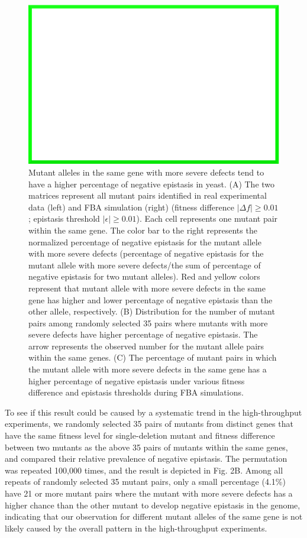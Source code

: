 \begin{figure}
\centering
\includegraphics[width=\textwidth]{dummy}
\caption{Mutant alleles in the same gene with more severe defects tend
to have a higher percentage of negative epistasis in yeast. (A) The
two matrices represent all mutant pairs identified in real
experimental data (left) and FBA simulation (right) (fitness
difference $\left|\Delta f\right| \geq 0.01$; epistasis threshold
$\left|\epsilon\right| \geq 0.01$). Each cell
represents one mutant pair within the same gene. The color bar to the
right represents the normalized percentage of negative epistasis for
the mutant allele with more severe defects (percentage of negative
epistasis for the mutant allele with more severe defects/the sum of
percentage of negative epistasis for two mutant alleles). Red and
yellow colors represent that mutant allele with more severe defects in
the same gene has higher and lower percentage of negative epistasis
than the other allele, respectively. (B) Distribution for the number
of mutant pairs among randomly selected 35 pairs where mutants with
more severe defects have higher percentage of negative epistasis. The
arrow represents the observed number for the mutant allele pairs
within the same genes. (C) The percentage of mutant pairs in which the
mutant allele with more severe defects in the same gene has a higher
percentage of negative epistasis under various fitness difference and
epistasis thresholds during FBA simulations.}
\label{fig:expVerifyYeast1}
\end{figure}

To see if this result could be caused by a systematic trend in the
high-throughput experiments, we randomly selected 35 pairs of mutants
from distinct genes that have the same fitness level for
single-deletion mutant and fitness difference between two mutants as
the above 35 pairs of mutants within the same genes, and compared
their relative prevalence of negative epistasis. The permutation was
repeated 100,000 times, and the result is depicted in Fig. 2B. Among
all repeats of randomly selected 35 mutant pairs, only a small
percentage (4.1\%) have 21 or more mutant pairs where the mutant with
more severe defects has a higher chance than the other mutant to
develop negative epistasis in the genome, indicating that our
observation for different mutant alleles of the same gene is not
likely caused by the overall pattern in the high-throughput
experiments.

